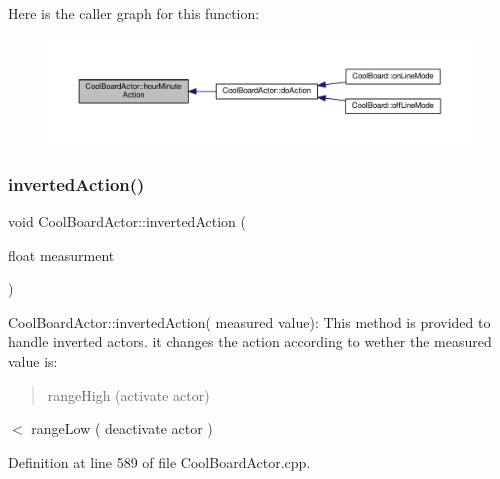 Here is the caller graph for this function\+:\nopagebreak
\begin{figure}[H]
\begin{center}
\leavevmode
\includegraphics[width=350pt]{dc/d69/class_cool_board_actor_a1eb1fbca19bc80aad20d2686d52317f8_icgraph}
\end{center}
\end{figure}
\mbox{\label{class_cool_board_actor_aae82b2e62f91be009d40f93c206f9bda}} 
\subsubsection{\texorpdfstring{inverted\+Action()}{invertedAction()}}
{\footnotesize\ttfamily void Cool\+Board\+Actor\+::inverted\+Action (\begin{DoxyParamCaption}\item[{float}]{measurment }\end{DoxyParamCaption})}

Cool\+Board\+Actor\+::inverted\+Action( measured value)\+: This method is provided to handle inverted actors. it changes the action according to wether the measured value is\+: \begin{quote}
range\+High (activate actor) \end{quote}
$<$ range\+Low ( deactivate actor ) 

Definition at line 589 of file Cool\+Board\+Actor.\+cpp.


